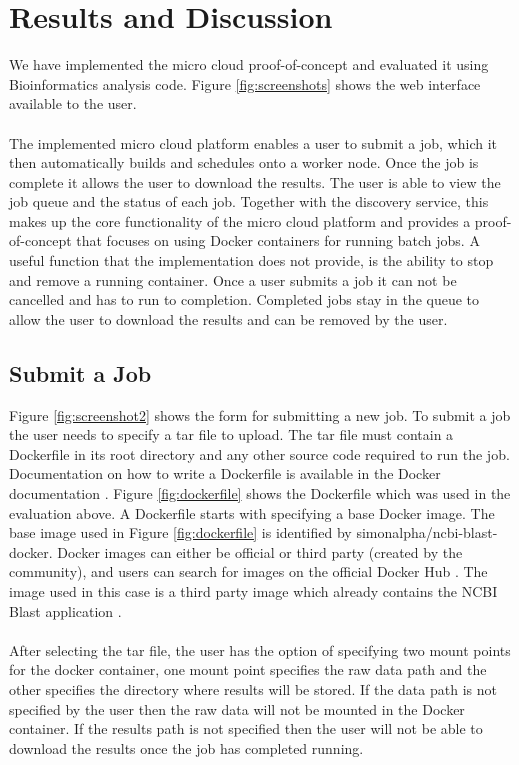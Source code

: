 \documentclass{sig-alternate-05-2015}
\begin{document}
\section{Results and Discussion}
We have implemented the micro cloud proof-of-concept and evaluated it using Bioinformatics analysis code. Figure \ref{fig:screenshots} shows the web interface available to the user. 
\\\\
The implemented micro cloud platform enables a user to submit a job, which it then automatically builds and schedules onto a worker node. Once the job is complete it allows the user to download the results. The user is able to view the job queue and the status of each job. Together with the discovery service, this makes up the core functionality of the micro cloud platform and provides a proof-of-concept that focuses on using Docker containers for running batch jobs. A useful function that the implementation does not provide, is the ability to stop and remove a running container. Once a user submits a job it can not be cancelled and has to run to completion. Completed jobs stay in the queue to allow the user to download the results and can be removed by the user. 


\subsection{Submit a Job}
Figure \ref{fig:screenshot2} shows the form for submitting a new job. 
To submit a job the user needs to specify a tar file to upload. The tar file must contain a Dockerfile in its root directory and any other source code required to run the job. Documentation on how to write a Dockerfile is available in the Docker documentation \cite{dockerfile}. Figure \ref{fig:dockerfile} shows the Dockerfile which was used in the evaluation above. A Dockerfile starts with specifying a base Docker image. The base image used in Figure \ref{fig:dockerfile} is identified by simonalpha/ncbi-blast-docker. Docker images can either be official or third party (created by the community), and users can search for images on the official Docker Hub \cite{dockerhub}. The image used in this case is a third party image which already contains the NCBI Blast application \cite{dockerblast}.
\\\\
After selecting the tar file, the user has the option of specifying two mount points for the docker container, one mount point specifies the raw data path and the other specifies the directory where results will be stored. If the data path is not specified by the user then the raw data will not be mounted in the Docker container. If the results path is not specified then the user will not be able to download the results once the job has completed running.
\end{document}
